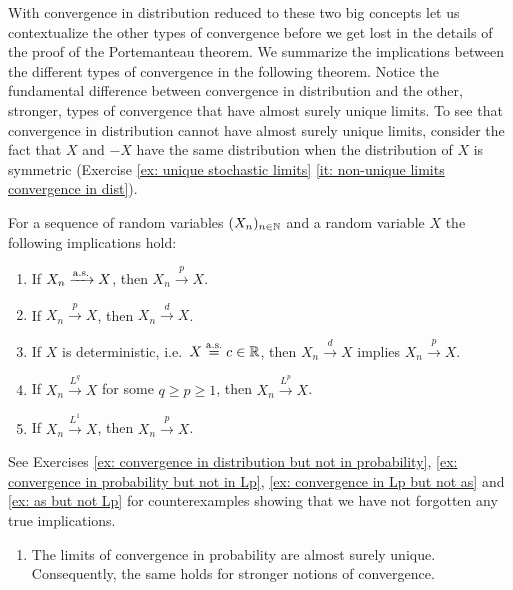 With convergence in distribution reduced to these two big concepts
let us contextualize the other types of convergence before we get lost in the details of the proof
of the Portemanteau theorem. We summarize the implications
between the different types of convergence in the following theorem.
Notice the fundamental difference between convergence in distribution and the
other, stronger, types of convergence that have almost surely unique limits. To
see that convergence in distribution cannot have almost surely unique limits,
consider the fact that \(X\) and \(-X\) have the same distribution when the
distribution of \(X\) is symmetric (Exercise \ref{ex: unique stochastic limits}
\ref{it: non-unique limits convergence in dist}).

\begin{theorem}
    \label{thm: convergence implications}
    For a sequence of random variables \((X_n)_{n\in\mathbb{N}}\) and a
    random variable \(X\) the following implications hold:
    \begin{center}
        
    \end{center}
    \begin{enumerate}[label=(\arabic*),noitemsep]
        \item\label{it: as to p}
        If \(X_n \xrightarrow{\operatorname{\text{a.s.}}} X\), then \(X_n \xrightarrow{p} X\).
        \item\label{it: p to d}
        If \(X_n \xrightarrow{p} X\), then \(X_n \xrightarrow{d} X\).
        \item \label{it: d to p}
        If \(X\) is deterministic, i.e.\ \(X \overset{\operatorname{\text{a.s.}}}= c\in \mathbb{R}\), then
        \(X_n \xrightarrow{d} X\) implies \(X_n \xrightarrow{p} X\).
        \item\label{it: Lq to Lp}
        If \(X_n \xrightarrow{L^q} X\) for some \(q \ge p \ge 1\), then \(X_n \xrightarrow{L^p} X\).
        \item\label{it: L1 to p}
        If \(X_n \xrightarrow{L^1} X\), then \(X_n \xrightarrow{p} X\).
    \end{enumerate}
    See Exercises \ref{ex: convergence in distribution but not in probability},
    \ref{ex: convergence in probability but not in Lp}, \ref{ex: convergence in
    Lp but not as} and \ref{ex: as but not Lp} for counterexamples showing that
    we have not forgotten any true implications.
    \begin{enumerate}[label=(\arabic*),noitemsep, resume]
        \item\label{it: uniqueness of limits}
        The limits of convergence in probability are almost surely unique.
        Consequently, the same holds for stronger notions of convergence.
    \end{enumerate}
\end{theorem}

